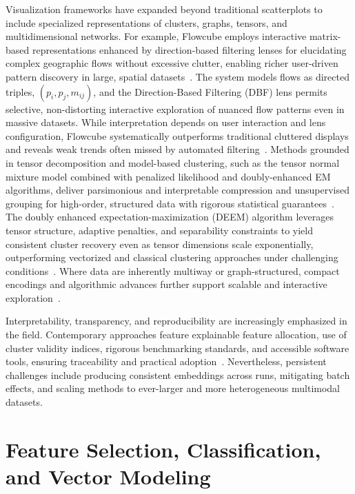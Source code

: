 \documentclass[sigconf]{acmart}
\begin{document}
Visualization frameworks have expanded beyond traditional scatterplots to include specialized representations of clusters, graphs, tensors, and multidimensional networks. For example, Flowcube employs interactive matrix-based representations enhanced by direction-based filtering lenses for elucidating complex geographic flows without excessive clutter, enabling richer user-driven pattern discovery in large, spatial datasets~\cite{ref53}. The system models flows as directed triples, $(p_i, p_j, m_{ij})$, and the Direction-Based Filtering (DBF) lens permits selective, non-distorting interactive exploration of nuanced flow patterns even in massive datasets. While interpretation depends on user interaction and lens configuration, Flowcube systematically outperforms traditional cluttered displays and reveals weak trends often missed by automated filtering~\cite{ref53}. Methods grounded in tensor decomposition and model-based clustering, such as the tensor normal mixture model combined with penalized likelihood and doubly-enhanced EM algorithms, deliver parsimonious and interpretable compression and unsupervised grouping for high-order, structured data with rigorous statistical guarantees~\cite{ref58}. The doubly enhanced expectation-maximization (DEEM) algorithm leverages tensor structure, adaptive penalties, and separability constraints to yield consistent cluster recovery even as tensor dimensions scale exponentially, outperforming vectorized and classical clustering approaches under challenging conditions~\cite{ref58}. Where data are inherently multiway or graph-structured, compact encodings and algorithmic advances further support scalable and interactive exploration~\cite{ref79,ref86}.

Interpretability, transparency, and reproducibility are increasingly emphasized in the field. Contemporary approaches feature explainable feature allocation, use of cluster validity indices, rigorous benchmarking standards, and accessible software tools, ensuring traceability and practical adoption~\cite{ref53,ref79,ref90,ref92,ref96,ref99}. Nevertheless, persistent challenges include producing consistent embeddings across runs, mitigating batch effects, and scaling methods to ever-larger and more heterogeneous multimodal datasets.

\section{Feature Selection, Classification, and Vector Modeling}
\end{document}
